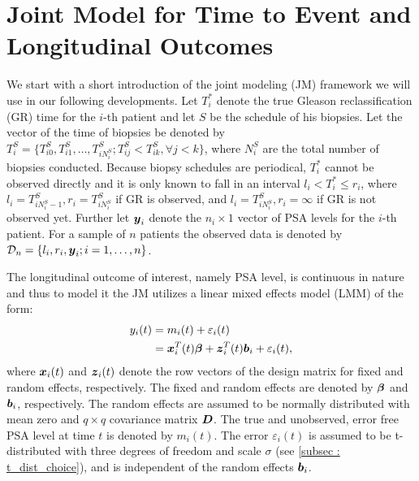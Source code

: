 \section{Joint Model for Time to Event and Longitudinal Outcomes}
\label{web_sec : jm_framework}
We start with a short introduction of the joint modeling (JM) framework we will use in our following developments. Let $T_i^*$ denote the true Gleason reclassification (GR) time for the $i$-th patient and let $S$ be the schedule of his biopsies. Let the vector of the time of biopsies be denoted by $T_i^S = \{T^S_{i0}, T^S_{i1}, \ldots, T^S_{i{N_i^S}}; T^S_{ij} < T^S_{ik}, \forall j<k\}$, where $N_i^S$ are the total number of biopsies conducted. Because biopsy schedules are periodical, $T_i^*$ cannot be observed directly and it is only known to fall in an interval $l_i < T_i^* \leq r_i$, where $l_i = T^S_{i{N_i^S - 1}}, r_i = T^S_{i{N_i^S}}$ if GR is observed, and $l_i = T^S_{i{N_i^S}}, r_i=\infty$ if GR is not observed yet. Further let $\boldsymbol{y}_i$ denote the $n_i \times 1$ vector of PSA levels for the $i$-th patient. For a sample of $n$ patients the observ{}ed data is denoted by $\mathcal{D}_n = \{l_i, r_i, \boldsymbol{y}_i; i = 1, \ldots, n\}$.

The longitudinal outcome of interest, namely PSA level, is continuous in nature and thus to model it the JM utilizes a linear mixed effects model (LMM) of the form:
\begin{equation*}
\begin{split}
y_i(t) &= m_i(t) + \varepsilon_i(t)\\
&=\boldsymbol{x}_i^T(t) \boldsymbol{\beta} + \boldsymbol{z}_i^T(t) \boldsymbol{b}_i + \varepsilon_i(t),
\end{split}
\end{equation*}
where $\boldsymbol{x}_i(t)$ and $\boldsymbol{z}_i(t)$ denote the row vectors of the design matrix for fixed and random effects, respectively. The fixed and random effects are denoted by $\boldsymbol{\beta}$ and $\boldsymbol{b}_i$, respectively. The random effects are assumed to be normally distributed with mean zero and $q \times q$ covariance matrix $\boldsymbol{D}$. The true and unobserved, error free PSA level at time $t$ is denoted by $m_i(t)$. The error $\varepsilon_i(t)$ is assumed to be t-distributed with three degrees of freedom and scale $\sigma$ (see \ref{subsec : t_dist_choice}), and is independent of the random effects $\boldsymbol{b}_i$.

